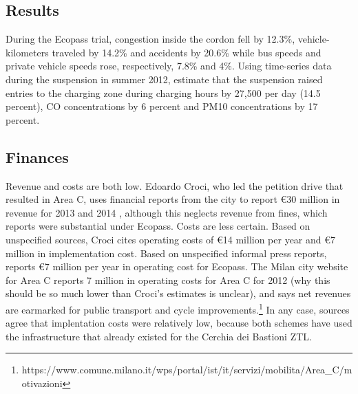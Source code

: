 \subsection{Results}

During the Ecopass trial, congestion inside the cordon fell by 12.3\%, vehicle-kilometers traveled by 14.2\% and accidents by 20.6\% while bus speeds and private vehicle speeds rose, respectively, 7.8\% and 4\%. Using time-series data during the suspension in summer 2012, \citet{Gibson2015} estimate that the suspension raised entries to the charging zone during charging hours by 27,500 per day (14.5 percent), CO concentrations by 6 percent and PM10 concentrations by 17 percent.

\subsection{Finances}

Revenue and costs are both low. Edoardo Croci, who led the petition drive that resulted in Area C, uses financial reports from the city to report \euro 30 million in revenue for 2013 and 2014 \citep[p. 257]{Croci2016}, although this neglects revenue from fines, which \citet{Rotaris2010} reports were substantial under Ecopass. Costs are less certain. Based on unspecified sources, Croci cites operating costs of \euro 14 million per year and \euro 7 million in implementation cost. Based on unspecified informal press reports, \citet{Rotaris2010} reports \euro 7 million per year in operating cost for Ecopass. The Milan city website for Area C reports 7 million in operating costs for Area C for 2012 (why this should be so much lower than Croci's estimates is unclear), and says net revenues are earmarked for public transport and cycle improvements.\footnote{https://www.comune.milano.it/wps/portal/ist/it/servizi/mobilita/Area\_C/motivazioni} In any case, sources agree that implentation costs were relatively low, because both schemes have used the infrastructure that already existed for the Cerchia dei Bastioni ZTL.





